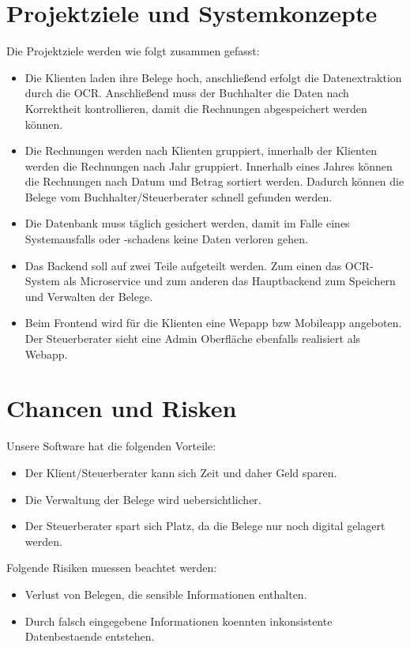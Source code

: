 \documentclass[12pt]{article}
\theoremstyle{definition}
\begin{document}
\pagebreak

\section{Projektziele und Systemkonzepte}
Die Projektziele werden wie folgt zusammen gefasst:
\begin{itemize}
\item Die Klienten laden ihre Belege hoch, anschließend erfolgt die Datenextraktion durch die OCR. Anschließend muss der Buchhalter die Daten nach Korrektheit kontrollieren, damit
die Rechnungen abgespeichert werden können.
\item Die Rechnungen werden nach Klienten gruppiert, innerhalb der Klienten werden die Rechnungen nach Jahr gruppiert. Innerhalb eines Jahres können die Rechnungen nach Datum und Betrag sortiert werden.
Dadurch können die Belege vom Buchhalter/Steuerberater schnell gefunden werden.
\item Die Datenbank muss täglich gesichert werden, damit im Falle eines Systemausfalls oder -schadens keine Daten verloren gehen. 
\item Das Backend soll auf zwei Teile aufgeteilt werden. Zum einen das OCR- System als Microservice und zum anderen das Hauptbackend zum Speichern und Verwalten der Belege.
\item Beim Frontend wird für die Klienten eine Wepapp bzw Mobileapp angeboten. Der Steuerberater sieht eine Admin Oberfläche ebenfalls realisiert als Webapp.
\end{itemize}

\pagebreak
\section{Chancen und Risken}


Unsere Software hat die folgenden Vorteile:
\begin{itemize}
\item Der Klient/Steuerberater kann sich Zeit und daher Geld sparen.
\item Die Verwaltung der Belege wird uebersichtlicher. 
\item Der Steuerberater spart sich Platz, da die Belege nur noch digital gelagert werden.
\end{itemize}

Folgende Risiken muessen beachtet werden:

\begin{itemize}
\item Verlust von Belegen, die sensible Informationen enthalten.
\item Durch falsch eingegebene Informationen koennten inkonsistente Datenbestaende entstehen.
\end{itemize}
\end{document}
